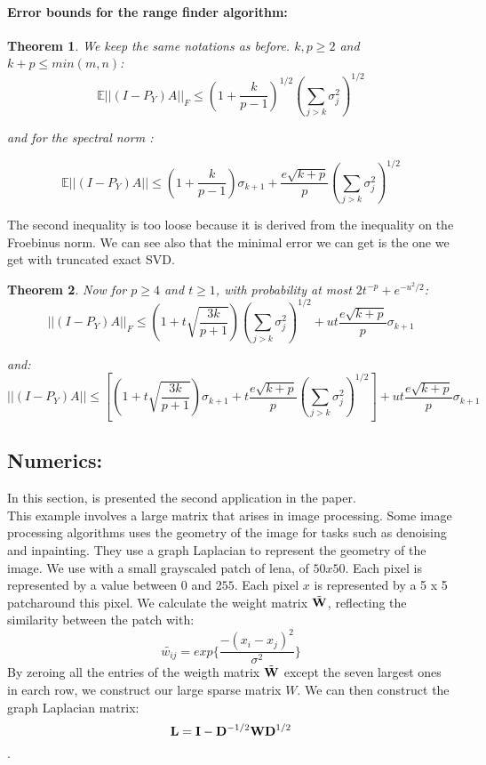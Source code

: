 \documentclass[onecolumn,11pt]{article}
\newtheorem{theorem}{Theorem}[section]
\newenvironment{remark}[1][Remark]{\begin{trivlist}
\item[\hskip \labelsep {\bfseries #1}]}{\end{trivlist}}
\begin{document}
\paragraph{Error bounds for the range finder algorithm:}
\begin{theorem}
We keep the same notations as before. $k,p\geq 2$ and $k+p\leq min(m,n)$:
\begin{equation}
\mathbb{E}||(I-P_Y)A||_F\leq (1+\frac{k}{p-1})^{1/2} (\sum_{j>k} \sigma_j^2)^{1/2}
\end{equation}

and for the spectral norm :

\begin{equation}
\mathbb{E}||(I-P_Y)A||\leq (1+\frac{k}{p-1})\sigma_{k+1}+ \frac{e\sqrt{k+p}}{p} (\sum_{j>k} \sigma_j^2)^{1/2}
\end{equation}
\end{theorem}

\begin{remark}
The second inequality is too loose because it is derived from the inequality on the Froebinus norm.
We can see also that the minimal error we can get is the one we get with truncated exact SVD.
\end{remark}

\begin{theorem}
Now for $p\geq 4$ and $t\geq 1$, with probability at most
$2t^{-p}+e^{-u^2/2}$:
$$
||(I-P_Y)A||_F\leq (1+t\sqrt{\frac{3k}{p+1}}) (\sum_{j>k} \sigma_j^2)^{1/2}+ut \frac{e\sqrt{k+p}}{p} \sigma_{k+1}
$$

and:
$$||(I-P_Y)A||\leq [(1+t\sqrt{\frac{3k}{p+1}}) \sigma_{k+1}+t \frac{e\sqrt{k+p}}{p} (\sum_{j>k} \sigma_j^2)^{1/2}]+ ut \frac{e\sqrt{k+p}}{p} \sigma_{k+1}$$

\end{theorem}
\subsection{Numerics:}
In this section, is presented the second application in the paper.\\

This example involves a large matrix that arises in image processing. Some
image processing algorithms uses the geometry of the image for tasks such as
denoising and inpainting. They use a graph Laplacian to represent the geometry of the image.
We use with a small grayscaled patch of lena, of $50 x 50$. Each pixel is
represented by a value between $0$ and $255$. Each pixel $x$ is represented by
a 5 x 5 patcharound this pixel. We calculate the weight matrix
$\tilde{\bold{W}}$, reflecting the similarity between the patch with:
$$\tilde{w_{ij}} = exp \{ \frac{- (x_i - x_j)^2}{\sigma^2}\}$$
By zeroing all the entries of the weigth matrix $\tilde{\bold{W}}$ except the seven
largest ones in earch row, we construct our large sparse matrix $W$.
We can then construct the graph Laplacian matrix:
$$\bold{L} = \bold{I} - \bold{D}^{-1/2} \bold{W} \bold{D}^{1/2}$$.
\end{document}
